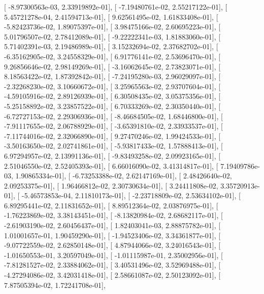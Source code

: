 \documentclass{article}
\begin{document}
       [ -8.97300563e-03,   2.33919892e-01],
       [ -7.19480761e-02,   2.55217122e-01],
       [  5.45721278e-04,   2.41594713e-01],
       [  9.62561495e-02,   1.61833408e-01],
       [ -5.82423736e-02,   1.89075397e-01],
       [  3.98475166e-02,   2.60695223e-01],
       [  5.01796507e-02,   2.78412089e-01],
       [ -9.22222341e-03,   1.81883060e-01],
       [  5.71402391e-03,   2.19486989e-01],
       [  3.15232694e-02,   2.37682702e-01],
       [ -6.35162905e-02,   3.24558329e-01],
       [  6.91776141e-02,   2.53696470e-01],
       [  9.26856646e-02,   2.98149269e-01],
       [ -3.16062645e-02,   2.73823071e-01],
       [  8.18563422e-02,   1.87392842e-01],
       [ -7.24195280e-03,   2.96029097e-01],
       [ -2.32268230e-02,   3.10660672e-01],
       [  3.25965563e-02,   2.93707604e-01],
       [ -4.59105916e-02,   2.89126939e-01],
       [  6.30508435e-02,   3.05375356e-01],
       [ -5.25158892e-02,   3.23857522e-01],
       [  6.70333269e-02,   2.30350440e-01],
       [ -6.72727153e-02,   2.29306936e-01],
       [ -8.46684505e-02,   1.68446800e-01],
       [ -7.91117655e-02,   2.06788929e-01],
       [ -3.65391810e-02,   2.33933537e-01],
       [ -7.11744016e-02,   2.32066890e-01],
       [  9.27470246e-02,   1.99424533e-01],
       [ -3.50163650e-02,   2.02741861e-01],
       [ -5.93817433e-02,   1.57888413e-01],
       [  6.97294957e-02,   2.13991136e-01],
       [ -9.83493258e-02,   2.09923165e-01],
       [  2.51046550e-02,   2.52405393e-01],
       [  6.66016090e-02,   3.41314817e-01],
       [  7.19409786e-03,   1.90865334e-01],
       [ -6.73253388e-02,   2.62147169e-01],
       [  2.48426640e-02,   2.09253375e-01],
       [  1.96466812e-02,   2.30730634e-01],
       [  3.24411808e-02,   3.35720913e-01],
       [ -5.46573853e-04,   2.11810173e-01],
       [ -2.23718809e-02,   2.53634102e-01],
       [  6.89295441e-02,   2.11831652e-01],
       [  8.89512364e-02,   2.03876975e-01],
       [ -1.76223869e-02,   3.38143451e-01],
       [ -8.13820984e-02,   2.68682117e-01],
       [ -2.61903190e-02,   2.60456437e-01],
       [  1.82403041e-03,   2.88875782e-01],
       [  1.01001657e-01,   1.90459290e-01],
       [ -1.94523406e-02,   3.34361877e-01],
       [ -9.07722559e-02,   2.62850148e-01],
       [  4.87944066e-02,   3.24016543e-01],
       [ -1.01650553e-01,   3.20597049e-01],
       [ -1.01115987e-01,   2.35002956e-01],
       [ -7.81281527e-02,   2.33884062e-01],
       [  3.40531496e-02,   3.52969488e-01],
       [ -4.27294086e-02,   3.42031418e-01],
       [  2.58661087e-02,   2.50123092e-01],
       [  7.87505394e-02,   1.72241708e-01],
\end{document}
